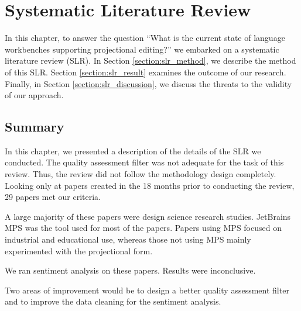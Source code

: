 \chapter{Systematic Literature Review}
\label{chapter:SLR}

In this chapter, to answer the question ``What is the current state of language workbenches supporting projectional editing?'' we embarked on a systematic literature review (SLR).
In Section \ref{section:slr_method}, we describe the method of this SLR.
Section \ref{section:slr_result} examines the outcome of our research.
Finally, in Section \ref{section:slr_discussion}, we discuss the threats to the validity of our approach. 








\section{Summary}
In this chapter, we presented a description of the details of the SLR we conducted.
The quality assessment filter was not adequate for the task of this review. 
Thus, the review did not follow the methodology design completely.
Looking only at papers created in the 18 months prior to conducting the review, 29 papers met our criteria.

A large majority of these papers were design science research studies.
JetBrains MPS was the tool used for most of the papers.
Papers using MPS focused on industrial and educational use, whereas those not using MPS mainly experimented with the projectional form.

We ran sentiment analysis on these papers. 
Results were inconclusive.

Two areas of improvement would be to design a better quality assessment filter and to improve the data cleaning for the sentiment analysis.